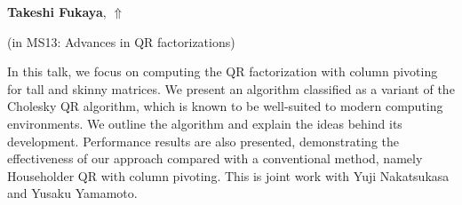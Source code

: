 \documentclass[ILAS2025-program.tex]{subfiles}
\begin{document}
\hypertarget{down0340}{}\begin{ilasabstract}
    
\textbf{Takeshi Fukaya},  \hfill \hyperlink{up0340}{$\Uparrow$}
    
    
(in {\color{mstitle}MS13: Advances in QR factorizations})
        
\mtskip
    In this talk, we focus on computing the QR factorization with column pivoting for tall and skinny matrices. 
We present an algorithm classified as a variant of the Cholesky QR algorithm, which is known to be well-suited to modern computing environments.
We outline the algorithm and explain the ideas behind its development.
Performance results are also presented, demonstrating the effectiveness of our approach compared with a conventional method, 
namely Householder QR with column pivoting.
This is joint work with Yuji Nakatsukasa and Yusaku Yamamoto.

\end{ilasabstract}
    
\end{document}
